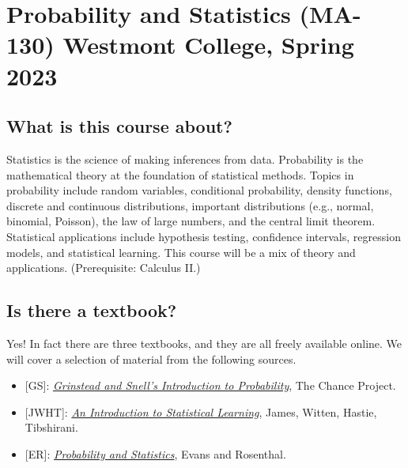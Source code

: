 \documentclass[
  twoside]{article}
\author{}
\date{\vspace{-2.5em}}
\providecommand{\tightlist}{%
  \setlength{\itemsep}{0pt}\setlength{\parskip}{0pt}}
\begin{document}
\hypertarget{probability-and-statistics-ma-130-westmont-college-spring-2023}{%
\section{Probability and Statistics (MA-130) Westmont College, Spring
2023}\label{probability-and-statistics-ma-130-westmont-college-spring-2023}}

\hypertarget{what-is-this-course-about}{%
\subsection{What is this course
about?}\label{what-is-this-course-about}}

Statistics is the science of making inferences from data. Probability is
the mathematical theory at the foundation of statistical methods. Topics
in probability include random variables, conditional probability,
density functions, discrete and continuous distributions, important
distributions (e.g., normal, binomial, Poisson), the law of large
numbers, and the central limit theorem. Statistical applications include
hypothesis testing, confidence intervals, regression models, and
statistical learning. This course will be a mix of theory and
applications. (Prerequisite: Calculus II.)

\hypertarget{is-there-a-textbook}{%
\subsection{Is there a textbook?}\label{is-there-a-textbook}}

Yes! In fact there are three textbooks, and they are all freely
available online. We will cover a selection of material from the
following sources.

\begin{itemize}
\tightlist
\item
  {[}GS{]}:
  \href{https://math.dartmouth.edu/~prob/prob/prob.pdf}{\emph{Grinstead and Snell's Introduction to Probability}},
  The Chance Project.
\item
  {[}JWHT{]}:
  \href{https://hastie.su.domains/ISLR2/ISLRv2_website.pdf}{\emph{An Introduction to Statistical Learning}},
  James, Witten, Hastie, Tibshirani.
\item
  {[}ER{]}:
  \href{https://www.utstat.toronto.edu/mikevans/jeffrosenthal/book.pdf}{\emph{Probability and Statistics}},
  Evans and Rosenthal.
\end{itemize}
\end{document}
